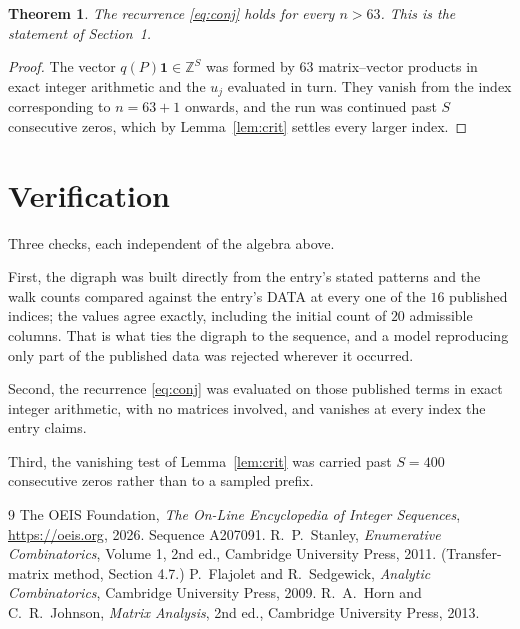 \documentclass[11pt,a4paper]{article}
\theoremstyle{plain}
\newtheorem{theorem}{Theorem}
\theoremstyle{definition}
\begin{document}
\begin{theorem}
The recurrence \eqref{eq:conj} holds for every $n>63$. This is the statement of
Section~1.
\end{theorem}

\begin{proof}
The vector $q(P)\mathbf{1}\in\mathbb{Z}^{S}$ was formed by $63$ matrix--vector
products in exact integer arithmetic and the $u_j$ evaluated in turn. They vanish from the
index corresponding to $n=63+1$ onwards, and the run was continued past $S$ consecutive
zeros, which by Lemma~\ref{lem:crit} settles every larger index.
\end{proof}

\section{Verification}

Three checks, each independent of the algebra above.

First, the digraph was built directly from the entry's stated patterns and the walk counts
compared against the entry's DATA at every one of the $16$ published indices; the
values agree exactly, including the initial count of $20$ admissible columns. That is
what ties the digraph to the sequence, and a model reproducing only part of the published
data was rejected wherever it occurred.

Second, the recurrence \eqref{eq:conj} was evaluated on those published terms in exact
integer arithmetic, with no matrices involved, and vanishes at every index the entry claims.

Third, the vanishing test of Lemma~\ref{lem:crit} was carried past $S=400$ consecutive
zeros rather than to a sampled prefix.

\begin{thebibliography}{9}
 The OEIS Foundation, \emph{The On-Line Encyclopedia of Integer
Sequences}, \url{https://oeis.org}, 2026. Sequence A207091.
 R.~P.~Stanley, \emph{Enumerative Combinatorics}, Volume 1, 2nd ed.,
Cambridge University Press, 2011. (Transfer-matrix method, Section 4.7.)
 P.~Flajolet and R.~Sedgewick, \emph{Analytic Combinatorics}, Cambridge
University Press, 2009.
 R.~A.~Horn and C.~R.~Johnson, \emph{Matrix Analysis}, 2nd ed., Cambridge
University Press, 2013.
\end{thebibliography}
\end{document}
